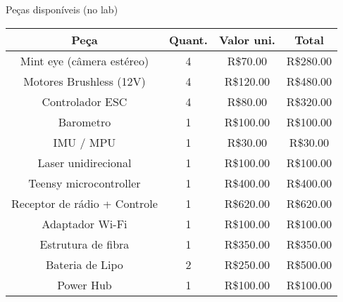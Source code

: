 \begin{frame}[t]{Peças disponíveis (no lab)}
  \transboxout[duration=0.5]
  \centering

  \begin{tabular}{c | c | c | c}
                Peça             & Quant. & Valor uni. & Total     \\ \hline
              Mint eye (câmera estéreo)            & 4      & R\$70.00   & R\$280.00 \\
      Motores Brushless (12V)    & 4      & R\$120.00  & R\$480.00 \\
          Controlador ESC        & 4      & R\$80.00   & R\$320.00 \\
             Barometro           & 1      & R\$100.00  & R\$100.00 \\
             IMU / MPU           & 1      & R\$30.00   & R\$30.00  \\
        Laser unidirecional      & 1      & R\$100.00  & R\$100.00 \\
       Teensy microcontroller    & 1      & R\$400.00  & R\$400.00 \\
    Receptor de rádio + Controle & 1      & R\$620.00  & R\$620.00 \\
          Adaptador Wi-Fi        & 1      & R\$100.00  & R\$100.00 \\
         Estrutura de fibra      & 1      & R\$350.00  & R\$350.00 \\
          Bateria de Lipo        & 2      & R\$250.00  & R\$500.00 \\
             Power Hub           & 1      & R\$100.00  & R\$100.00
  \end{tabular}

\end{frame}


